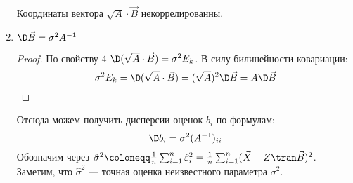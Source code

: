 \begin{prop}
\begin{enumerate}
              \begin{corollary}
                  Координаты вектора \(\sqrt{A} \cdot \vec{B}\) некоррелированны.
              \end{corollary}
        \item \(\D \vec{B} = \sigma^2 A^{-1}\)
              \begin{proof}
                  По свойству 4 \(\D(\sqrt{A} \cdot \vec{B}) = \sigma^2 E_k\). В силу билинейности ковариации:
                  \[\sigma^2 E_k = \D(\sqrt{A} \cdot \vec{B}) = (\sqrt{A})^2 \D \vec{B} = A \D \vec{B}\]
              \end{proof}

              Отсюда можем получить дисперсии оценок \(b_i\) по формулам:
              \[\D b_i = \sigma^2 (A^{-1})_{ii}\]
              Обозначим через \(\hat{\sigma}^2 \coloneqq \frac{1}{n} \sum_{i=1}^{n} \hat{\varepsilon}_i^2 = \frac{1}{n} \sum_{i=1}^{n} (\vec{X} - Z\tran \vec{B})^2\). Заметим, что \(\hat{\sigma}^2\) --- точная оценка неизвестного параметра \(\sigma^2\).
    \end{enumerate}
\end{prop}

